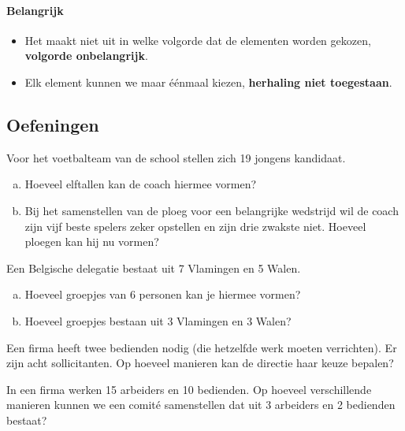 \documentclass[12pt,a4,twoside]{article}
\begin{document}
\paragraph*{Belangrijk}
\begin{itemize}
  \item Het maakt niet uit in welke volgorde dat de elementen worden gekozen, {\bf volgorde onbelangrijk}.
  \item Elk element kunnen we maar éénmaal kiezen, {\bf herhaling niet toegestaan}.
\end{itemize}

\subsection{Oefeningen}

\begin{oefening}
Voor het voetbalteam van de school stellen zich 19 jongens kandidaat.
\begin{enumerate}[(a)]
  \item Hoeveel elftallen kan de coach hiermee vormen?
  \item Bij het samenstellen van de ploeg voor een belangrijke wedstrijd wil de coach zijn vijf beste spelers zeker opstellen en zijn drie zwakste niet. Hoeveel ploegen kan hij nu vormen?
\end{enumerate}
\end{oefening}

\begin{oefening}
Een Belgische delegatie bestaat uit 7 Vlamingen en 5 Walen.
\begin{enumerate}[(a)]
  \item Hoeveel groepjes van 6 personen kan je hiermee vormen?
  \item Hoeveel groepjes bestaan uit 3 Vlamingen en 3 Walen?
\end{enumerate}
\end{oefening}

\begin{oefening}
Een firma heeft twee bedienden nodig (die hetzelfde werk moeten verrichten). Er zijn acht sollicitanten. Op hoeveel manieren kan de directie haar keuze bepalen?
\end{oefening}

\begin{oefening}
In een firma werken 15 arbeiders en 10 bedienden. Op hoeveel verschillende manieren kunnen we een comité samenstellen dat uit 3 arbeiders en 2 bedienden bestaat?
\end{oefening}
\end{document}
